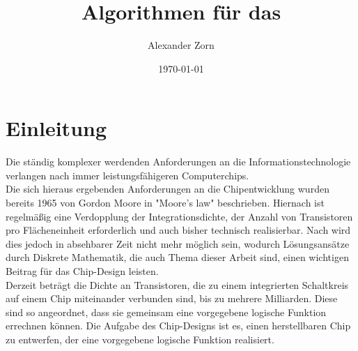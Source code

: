 \documentclass[11pt, a4paper, german]{article}
\author{Alexander Zorn}
\date{\today}
\title{Algorithmen f\"ur das \TM}
\begin{document}
\setlength{\parindent}{0pt} %
\renewcommand{\proofname}{Beweis:}
\maketitle

\setcounter{tocdepth}{2}
\tableofcontents
\newpage 
\section{Einleitung}
\label{sec:einleitung}
Die ständig komplexer werdenden Anforderungen an die Informationstechnologie verlangen nach immer leistungsfähigeren Computerchips. \\
Die sich hieraus ergebenden Anforderungen an die Chipentwicklung wurden bereits 1965 von Gordon Moore in "Moore's law"  \cite{Moore} beschrieben. Hiernach ist regelmäßig eine Verdopplung der Integrationsdichte, der Anzahl von Transistoren pro Flächeneinheit erforderlich und auch bisher technisch realisierbar. Nach \cite{Khan} wird dies jedoch in absehbarer Zeit nicht mehr möglich sein, wodurch Lösungsansätze durch Diskrete Mathematik, die auch Thema dieser Arbeit sind, einen wichtigen Beitrag für das Chip-Design leisten. \\
Derzeit beträgt die Dichte an Transistoren, die zu einem integrierten Schaltkreis auf einem Chip miteinander verbunden sind, bis zu mehrere Milliarden. Diese sind so angeordnet, dass sie gemeinsam eine vorgegebene logische Funktion errechnen können. Die Aufgabe des Chip-Designs ist es, einen herstellbaren Chip zu entwerfen, der eine vorgegebene logische Funktion realisiert.\\
\end{document}
